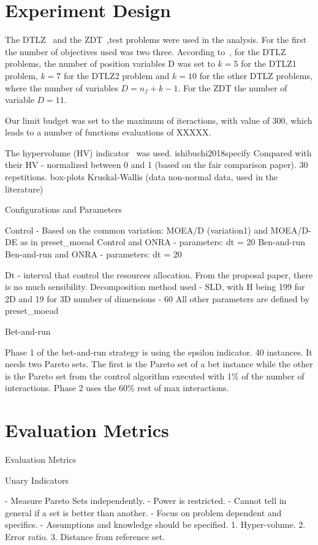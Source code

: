 \section{Experiment Design}

The DTLZ~\cite{deb2005scalable} and the ZDT~\cite{zitzler2000comparison},test problems were used in the analysis. For the first the number of objectives used was two three. According to~\cite{deb2005scalable}, for the DTLZ problems, the number of position variables D was set to $k = 5$ for the DTLZ1 problem, $k = 7$ for the DTLZ2 problem and $k = 10$ for the other DTLZ problems, where the number of variables $D = n_f + k -1$. For the ZDT the number of variable $D = 11$.

Our limit budget was set to the maximum of iteractions, with value of 300, which leads to a number of functions evaluations of XXXXX.


The hypervolume (HV) indicator~\cite{zitzler1998multiobjective} was used. ishibuchi2018specify
Compared with their HV - normalized between 0 and 1 (based on the fair comparison paper).
30 repetitions.
box-plots 
Kruskal-Wallis (data non-normal data, used in the literature)

Configurations and Parameters

Control - Based on the common variation: MOEA/D (variation1) and MOEA/D-DE as in preset\_moead
Control and ONRA - parameters: dt = 20
Ben-and-run
Ben-and-run and ONRA - parameters: dt = 20

Dt - interval that control the resources allocation. From the proposal paper, there is no much sensibility.
Decomposition method used - SLD, with H being 199 for 2D and 19 for 3D 
number of dimensions - 60 
All other parameters are defined by  preset\_moead

Bet-and-run

Phase 1 of the bet-and-run strategy is using the epsilon indicator. 40 instances.
It needs two Pareto sets. The first is the Pareto set of a bet instance while the other is the Pareto set from the control algorithm executed with 1\% of the number of interactions. 
Phase 2 uses the 60\% rest of max interactions.

\section{Evaluation Metrics}

Evaluation Metrics

Unary Indicators

- Measure Pareto Sets independently.
- Power is restricted.
- Cannot tell in general if a set is better than another.
- Focus on problem dependent and specifics.
- Assumptions and knowledge should be specified.
1. Hyper-volume.
2. Error ratio.
3. Distance from reference set.

